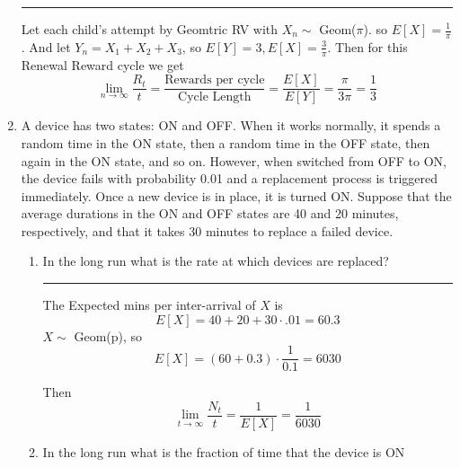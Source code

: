 \documentclass{article} %
\theoremstyle{plain}
\theoremstyle{case}
\begin{document}
\begin{enumerate}[label={\fbox{\textbf{Exercise \#\arabic* :}}}]
\par\noindent\rule{\textwidth}{0.1pt}
      Let each child's attempt by Geomtric RV with $X_n \sim $ Geom($\pi$).
    so $E[X] = \frac{1}{\pi}$.
    And let $Y_n = X_1 + X_2 + X_3$, so $E[Y] = 3, E[X] = \frac{3}{\pi}$. 
    Then for this Renewal Reward cycle we get
    \[ \lim_{n \to \infty} \frac{R_t}{t} =
        \frac{\text{Rewards per cycle}}{\text{Cycle Length}}
        = \frac{E[X]}{E[Y]}
        = \frac{\pi}{3 \pi} = \frac{1}{3}   \]
  \newpage
  \item A device has two states: ON and OFF. When it works normally, it
    spends a random time in the ON state, then a random time in the OFF
    state, then again in the ON state, and so on. However, when switched
    from OFF to ON, the device fails with probability 0.01 and a
    replacement process is triggered immediately. Once a new device is in
    place, it is turned ON. Suppose that the average durations in the ON
    and OFF states are 40 and 20 minutes, respectively, and that it takes
    30 minutes to replace a failed device.
    \begin{enumerate}
      \item In the long run what is the rate at which devices are replaced?
\par\noindent\rule{\textwidth}{0.1pt}
        The Expected mins per inter-arrival of $X$ is
        \[ E[X] = 40 + 20 + 30 \cdot .01 = 60.3 \]
        $X \sim$ Geom(p), so 
        \[ E[X] = (60 + 0.3) \cdot \frac{1}{0.1} = 6030 \]

        Then
        \[ \lim_{t \to \infty} \frac{N_t}{t} = \frac{1}{E[X]} =  \frac{1}{6030} \]
      \item In the long run what is the fraction of time that the device is ON


\end{enumerate}
\end{enumerate}
\end{document}
